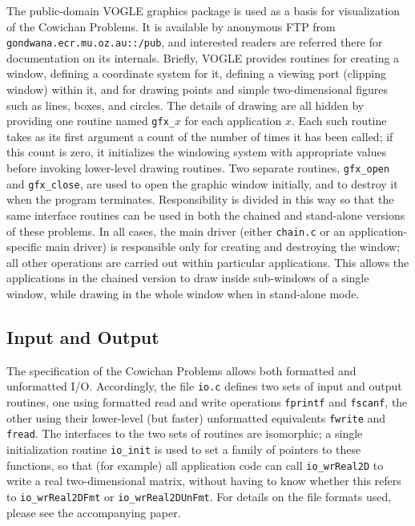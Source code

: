 The public-domain VOGLE graphics package is used as a basis for
visualization of the Cowichan Problems.
It is available by anonymous FTP from {\tt{gondwana.ecr.mu.oz.au::/pub}},
and interested readers are referred there for documentation on its internals.
Briefly,
VOGLE provides routines for creating a window,
defining a coordinate system for it,
defining a viewing port (clipping window) within it,
and for drawing points and simple two-dimensional figures such as
lines, boxes, and circles.
The details of drawing are all hidden
by providing one routine named {\tt{gfx\_$x$}} for each application $x$.
Each such routine takes as its first argument
a count of the number of times it has been called;
if this count is zero,
it initializes the windowing system with appropriate values
before invoking lower-level drawing routines.
Two separate routines,
{\tt{gfx\_open}} and {\tt{gfx\_close}},
are used to open the graphic window initially,
and to destroy it when the program terminates.
Responsibility is divided in this way so that
the same interface routines can be used in both
the chained and stand-alone versions of these problems.
In all cases,
the main driver (either {\tt{chain.c}} or an application-specific main driver)
is responsible only for creating and destroying the window;
all other operations are carried out within particular applications.
This allows the applications in the chained version
to draw inside sub-windows of a single window,
while drawing in the whole window when in stand-alone mode.

\subsection{Input and Output\label{s:util-io}}

The specification of the Cowichan Problems allows both formatted and unformatted I/O.
Accordingly,
the file {\tt{io.c}} defines two sets of input and output routines,
one using formatted read and write operations {\tt{fprintf}} and {\tt{fscanf}},
the other using their lower-level (but faster) unformatted equivalents
{\tt{fwrite}} and {\tt{fread}}.
The interfaces to the two sets of routines are isomorphic;
a single initialization routine {\tt{io\_init}} is used
to set a family of pointers to these functions,
so that (for example)
all application code can call {\tt{io\_wrReal2D}}
to write a real two-dimensional matrix,
without having to know whether this refers to
{\tt{io\_wrReal2DFmt}} or {\tt{io\_wrReal2DUnFmt}}.
For details on the file formats used,
please see the accompanying paper.

